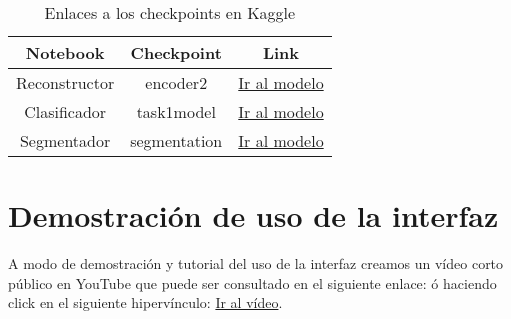 \begin{table}[H]
	\centering
	\begin{tabular}{|ccc|}
		\toprule
		Notebook & Checkpoint & Link \\
		\midrule
		Reconstructor & encoder2 & \href{https://www.kaggle.com/datasets/jaimecastillo/encoder2}{Ir al modelo} \\
		Clasificador & task1model &  \href{https://www.kaggle.com/datasets/jaimecastillo/task1model}{Ir al modelo}\\
		Segmentador & segmentation & \href{https://www.kaggle.com/datasets/jaimecastillo/segmentation}{Ir al modelo}\\  
		\bottomrule
	\end{tabular}
	\caption{Enlaces a los checkpoints en Kaggle}
	\label{tabla:checkpointsKaggle}
\end{table}

\section{Demostración de uso de la interfaz}

A modo de demostración y tutorial del uso de la interfaz creamos un vídeo corto público en YouTube que puede ser consultado en el siguiente enlace:  ó haciendo click en el siguiente hipervínculo: \href{https://www.kaggle.com/datasets/jaimecastillo}{Ir al vídeo}.